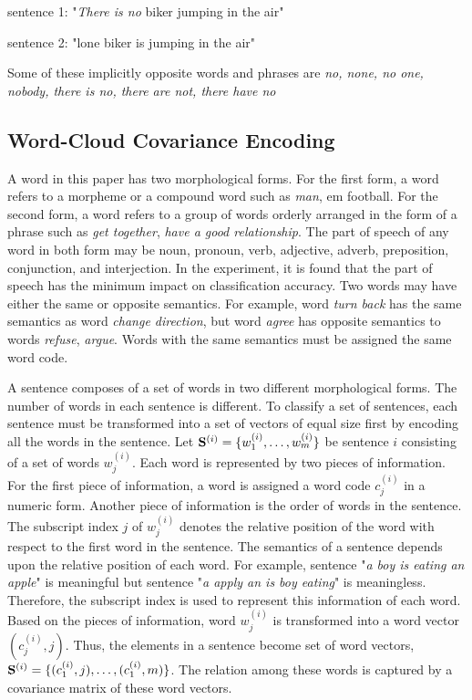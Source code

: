 \documentclass[11pt]{article}
\begin{document}
sentence 1: "{\em There is no} biker jumping in the air"

sentence 2: "lone biker is jumping in the air"

\noindent
Some of these implicitly opposite words and phrases are {\em no, none, no one, nobody, there is no,
there are not, there have no}
  
\subsection{Word-Cloud Covariance Encoding}

A word in this paper has two morphological forms. For the first form, a word refers to a morpheme or 
a compound word such as {\em man}, {em football}. For the second form,
a word refers to a group of words orderly arranged in the form of a phrase such as {\em get together}, 
{\em have a good relationship}. The part of speech of any word in both form may 
be noun, pronoun, verb, adjective, adverb, preposition, conjunction, and interjection. In the experiment, 
it is found that the part of speech has the minimum impact on classification accuracy. Two words may 
have either the same or opposite semantics. For example, word {\em turn back} has the same semantics as 
word {\em change direction}, but word {\em agree} has opposite semantics to words {\em refuse}, 
{\em argue}. Words with the same semantics must be assigned the same word code.

A sentence composes of a set of words in two different morphological forms. The number of words in each 
sentence is different. To classify a set of sentences, each sentence must be transformed into a set of
vectors of equal size first by encoding all the words in the sentence. Let ${\bf S}^{(i)} = \{w^{(i)}_{1}, 
\ldots, w^{(i)}_{m}\}$ be sentence $i$ consisting of a set of words $w^{(i)}_{j}$. Each word is represented
by two pieces of information. For the first piece of information, a word is assigned 
a word code $c^{(i)}_{j}$ in a numeric form. Another piece of information is the order of words in the 
sentence. The subscript index $j$ of $w^{(i)}_{j}$ denotes the relative
position of the word with respect to the first word in the sentence. The semantics of a sentence depends
upon the relative position of each word. For example, sentence "{\em a boy is eating an apple}" is meaningful 
but sentence "{\em a apply an is boy eating}" is meaningless. Therefore, the subscript index is used to
represent this information of each word. Based on the pieces of information, word $w^{(i)}_{j}$ is transformed
into a word vector $(c^{(i)}_{j}, j)$. Thus, the elements in a sentence become set of word vectors, 
${\bf S}^{(i)} = \{(c^{(i)}_{1},j) ,\ldots, (c^{(i)}_{1},m)\}$. The relation among these words is captured 
by a covariance matrix of these word vectors. 
\end{document}
